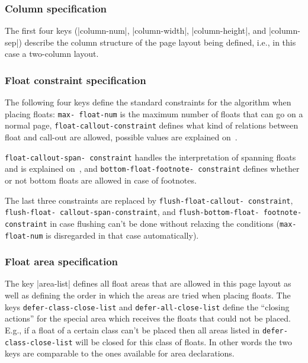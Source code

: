 \documentclass[twocolumn]{article}
\begin{document}
\subsubsection{Column specification}

The first four keys (|column-num|, |column-width|, |column-height|,
and  |column-sep|) describe the column structure of the page layout
being defined, i.e., in this case a two-column layout.

\subsubsection{Float constraint specification}

The following four keys define the standard constraints for the
algorithm when placing floats: \texttt{max-\allowbreak
float-\allowbreak num} is the maximum number of floats that can go on
a normal page,
\texttt{float-\allowbreak callout-\allowbreak constraint} defines 
what kind of relations between float and call-out are allowed,
possible values are explained on~.

\texttt{float-\allowbreak callout-\allowbreak span-\allowbreak
constraint} handles the interpretation of spanning floats and is
explained on~, and
\texttt{bottom-\allowbreak float-\allowbreak footnote-\allowbreak
constraint} defines whether or not bottom floats are allowed in case
of footnotes. 

The last three constraints are replaced by
\texttt{flush-\allowbreak float-\allowbreak callout-\allowbreak
constraint}, \texttt{flush-\allowbreak float-\allowbreak
 callout-\allowbreak span-\allowbreak constraint}, and
\texttt{flush-\allowbreak bottom-\allowbreak float-\allowbreak
footnote-\allowbreak constraint} in case flushing can't be done
without relaxing the conditions (\texttt{max-\allowbreak
float-\allowbreak num} is disregarded in that case automatically).

\subsubsection{Float area specification}

The key |area-list| defines all float areas that are allowed in this
page layout as well as defining the order in which the areas are tried
when placing floats.  
The keys \texttt{defer-class-close-list} and
\texttt{defer-all-close-list} define the ``closing actions'' for the
special area which receives the floats that could not be placed. E.g.,
if a float of a certain class can't be placed then all areas listed in
\texttt{defer-class-close-list} will be closed for this class of
floats. In other
words the two keys are comparable to the ones available for area
declarations.
\end{document}
